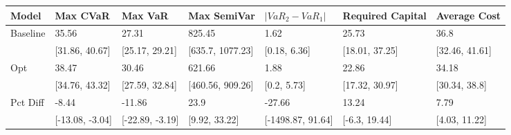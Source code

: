 \begin{tabular}{lllllll}
\toprule
   Model &        Max CVaR &         Max VaR &      Max SemiVar & $|VaR_2 - VaR_1|$ & Required Capital &   Average Cost \\
\midrule
Baseline &           35.56 &           27.31 &           825.45 &              1.62 &            25.73 &           36.8 \\
         &  [31.86, 40.67] &  [25.17, 29.21] & [635.7, 1077.23] &      [0.18, 6.36] &   [18.01, 37.25] & [32.46, 41.61] \\
     Opt &           38.47 &           30.46 &           621.66 &              1.88 &            22.86 &          34.18 \\
         &  [34.76, 43.32] &  [27.59, 32.84] & [460.56, 909.26] &       [0.2, 5.73] &   [17.32, 30.97] &  [30.34, 38.8] \\
Pct Diff &           -8.44 &          -11.86 &             23.9 &            -27.66 &            13.24 &           7.79 \\
         & [-13.08, -3.04] & [-22.89, -3.19] &    [9.92, 33.22] & [-1498.87, 91.64] &    [-6.3, 19.44] &  [4.03, 11.22] \\
\bottomrule
\end{tabular}
